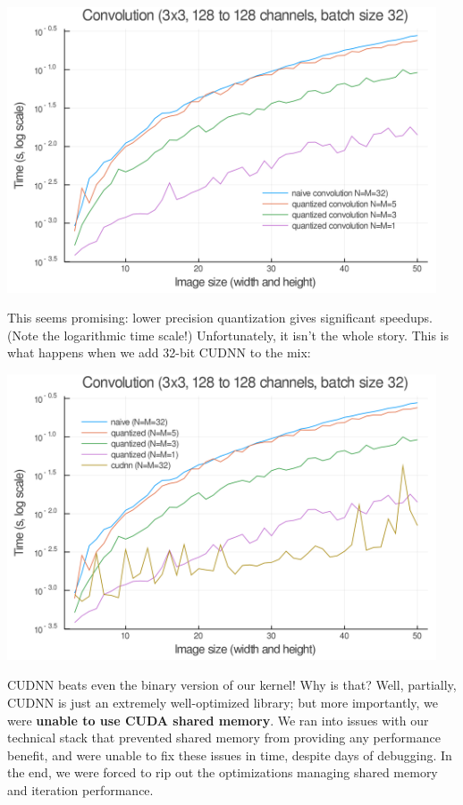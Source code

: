 \documentclass[12pt]{article}
\begin{document}
\begin{center}
\includegraphics[width=5in]{./plots/varysizenocudnn.png}
\end{center}

This seems promising: lower precision quantization gives significant speedups. (Note the logarithmic time scale!) Unfortunately, it isn't the whole story. This is what happens when we add 32-bit CUDNN to the mix:

\begin{center}
\includegraphics[width=5in]{./plots/varysizecudnn.png}
\end{center}

CUDNN beats even the binary version of our kernel! Why is that? Well, partially, CUDNN is just an extremely well-optimized library; but more importantly, we were \textbf{unable to use CUDA shared memory}. We ran into issues with our technical stack that prevented shared memory from providing any performance benefit, and were unable to fix these issues in time, despite days of debugging. In the end, we were forced to rip out the optimizations managing shared memory and iteration performance.
\end{document}
